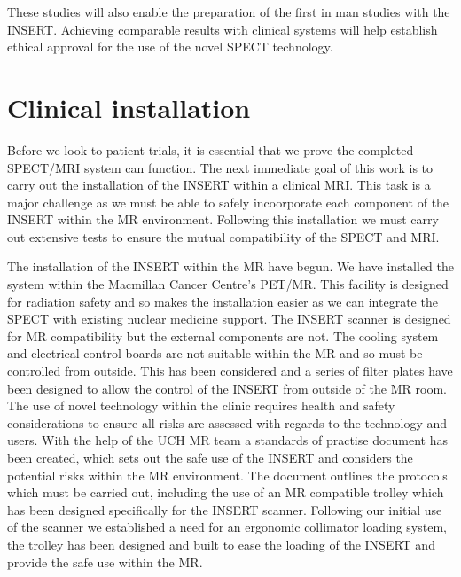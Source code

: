 These studies will also enable the preparation of the first in man studies with the \acrshort{INSERT}. Achieving comparable results with clinical systems will help establish ethical approval for the use of the novel \acrshort{SPECT} technology. 

\section{Clinical installation}
Before we look to patient trials, it is essential that we prove the completed \acrshort{SPECT/MRI} system can function. The next immediate goal of this work is to carry out the installation of the \acrshort{INSERT} within a clinical \acrshort{MRI}. This task is a major challenge as we must be able to safely incoorporate each component of the \acrshort{INSERT} within the \acrshort{MR} environment. Following this installation we must carry out extensive tests to ensure the mutual compatibility of the \acrshort{SPECT} and \acrshort{MRI}. 

The installation of the \acrshort{INSERT} within the \acrshort{MR} have begun. We have installed the system within the Macmillan Cancer Centre's \acrshort{PET/MR}. This facility is designed for radiation safety and so makes the installation easier as we can integrate the \acrshort{SPECT} with existing nuclear medicine support. The \acrshort{INSERT} scanner is designed for \acrshort{MR} compatibility but the external components are not. The cooling system and electrical control boards are not suitable within the \acrshort{MR} and so must be controlled from outside. This has been considered and a series of filter plates have been designed to allow the control of the \acrshort{INSERT} from outside of the \acrshort{MR} room. The use of novel technology within the clinic requires health and safety considerations to ensure all risks are assessed with regards to the technology and users. With the help of the \acrshort{UCH} \acrshort{MR} team a standards of practise document has been created, which sets out the safe use of the \acrshort{INSERT} and considers the potential risks within the \acrshort{MR} environment. The document outlines the protocols which must be carried out, including the use of an \acrshort{MR} compatible trolley which has been designed specifically for the \acrshort{INSERT} scanner. Following our initial use of the scanner we established a need for an ergonomic collimator loading system, the trolley has been designed and built to ease the loading of the \acrshort{INSERT} and provide the safe use within the \acrshort{MR}. 
